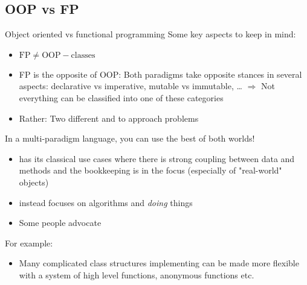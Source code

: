 \subsection{OOP vs FP}

\begin{frame}{Object oriented vs functional programming}
	Some key aspects to keep in mind:
	\begin{itemize}
		\item $\text{FP} \neq \text{OOP} - \text{classes}$
		\item FP is  the opposite of OOP: Both paradigms take opposite stances in several aspects: declarative vs imperative, mutable vs immutable, \dots{} $\Longrightarrow$ Not everything can be classified into one of these categories
		\item Rather: Two different  and to approach problems 
	\end{itemize}
	
	\medskip	
	In a multi-paradigm language, you can use the best of both worlds!
	\begin{itemize}
		\item {} has its classical use cases where there is strong coupling between data and methods and the bookkeeping is in the focus (especially of "real-world" objects)
		\item {} instead focuses on algorithms and \emph{doing} things
		\item Some people advocate  
	\end{itemize}

	For example:
	\begin{itemize}
		\item Many complicated class structures implementing  can be made more flexible with a system of high level functions, anonymous functions etc.
	\end{itemize}
\end{frame}
